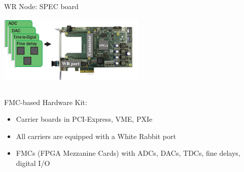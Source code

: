 \documentclass[compress,red]{beamer}
\begin{document}
\begin{frame}{WR Node: SPEC board}

    \begin{center}
    \includegraphics[width=7cm]{node/spec.jpg}
    \end{center}

  \begin{columns}[c]

	\begin{block}{FMC-based Hardware Kit:}
	  \begin{itemize}
	  \item Carrier boards in PCI-Express, VME, PXIe
	  \item All carriers are equipped with a White Rabbit port
	  \item FMCs (FPGA Mezzanine Cards) with ADCs, DACs, TDCs, fine delays, digital I/O
	  \end{itemize}
	\end{block}

  \end{columns}


\end{frame}
\end{document}
